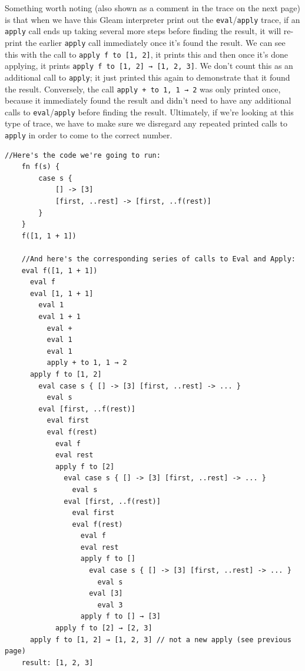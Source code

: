Something worth noting (also shown as a comment in the trace on the next page) is that when we have this Gleam interpreter print out the \texttt{eval}/\texttt{apply} trace, if an \texttt{apply} call ends up taking several more steps before finding the result, it will re-print the earlier \texttt{apply} call immediately once it's found the result.
We can see this with the call to \lstinline{apply f to [1, 2]}, it prints this and then once it's done applying, it prints \lstinline{apply f to [1, 2] → [1, 2, 3]}. We don't count this as an additional call to \texttt{apply}; it just printed this again to demonstrate that it found the result. 
Conversely, the call \lstinline{apply + to 1, 1 → 2} was only printed once, because it immediately found the result and didn't need to have any additional calls to \texttt{eval}/\texttt{apply} before finding the result.
Ultimately, if we're looking at this type of trace, we have to make sure we disregard any repeated printed calls to \texttt{apply} in order to come to the correct number.

\newpage
\begin{lstlisting}[basicstyle=\ttfamily\footnotesize, gobble=4]
    //Here's the code we're going to run:
    fn f(s) {
        case s {
            [] -> [3]
            [first, ..rest] -> [first, ..f(rest)]
        }
    }
    f([1, 1 + 1])

    //And here's the corresponding series of calls to Eval and Apply:
    eval f([1, 1 + 1])
      eval f
      eval [1, 1 + 1]
        eval 1
        eval 1 + 1
          eval +
          eval 1
          eval 1
          apply + to 1, 1 → 2
      apply f to [1, 2]
        eval case s { [] -> [3] [first, ..rest] -> ... }
          eval s
        eval [first, ..f(rest)]
          eval first
          eval f(rest)
            eval f
            eval rest
            apply f to [2]
              eval case s { [] -> [3] [first, ..rest] -> ... }
                eval s
              eval [first, ..f(rest)]
                eval first
                eval f(rest)
                  eval f
                  eval rest
                  apply f to []
                    eval case s { [] -> [3] [first, ..rest] -> ... }
                      eval s
                    eval [3]
                      eval 3
                  apply f to [] → [3]
            apply f to [2] → [2, 3]
      apply f to [1, 2] → [1, 2, 3] // not a new apply (see previous page)
    result: [1, 2, 3]
\end{lstlisting}
